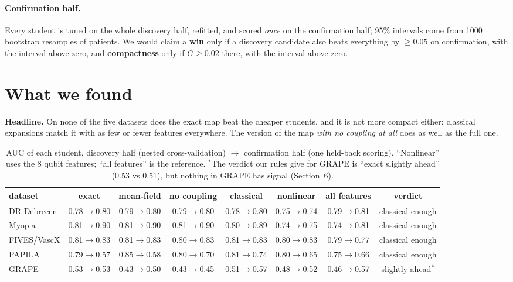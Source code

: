 \documentclass[11pt]{article}
\begin{document}
\paragraph{Confirmation half.} Every student is tuned on the whole discovery half, refitted, and scored
\emph{once} on the confirmation half; 95\% intervals come from 1000 bootstrap resamples of patients. We
would claim a \textbf{win} only if a discovery candidate also beats everything by $\ge0.05$ on confirmation,
with the interval above zero, and \textbf{compactness} only if $G\ge0.02$ there, with the interval above zero.

\section{What we found}

\textbf{Headline.} On none of the five datasets does the exact map beat the cheaper students, and it is not
more compact either: classical expansions match it with as few or fewer features everywhere. The version of
the map \emph{with no coupling at all} does as well as the full one.

\begin{table}[H]\centering\small
\caption{AUC of each student, discovery half (nested cross-validation) $\to$ confirmation half (one held-back
scoring). ``Nonlinear'' uses the 8 qubit features; ``all features'' is the reference.
$^\ast$The verdict our rules give for GRAPE is ``exact slightly ahead'' (0.53 vs 0.51), but nothing in GRAPE
has signal (Section~6).}\label{tab:auc}
\footnotesize\setlength{\tabcolsep}{3.5pt}
\begin{tabular}{@{}lccccccc@{}}\toprule
dataset & exact & mean-field & no coupling & classical & nonlinear & all features & verdict\\\midrule
DR Debrecen & 0.78$\to$0.80 & 0.79$\to$0.80 & 0.79$\to$0.80 & 0.78$\to$0.80 & 0.75$\to$0.74 & 0.79$\to$0.81 & classical enough\\
Myopia      & 0.81$\to$0.90 & 0.81$\to$0.90 & 0.81$\to$0.90 & 0.80$\to$0.89 & 0.74$\to$0.75 & 0.74$\to$0.81 & classical enough\\
FIVES/VascX & 0.81$\to$0.83 & 0.81$\to$0.83 & 0.80$\to$0.83 & 0.81$\to$0.83 & 0.80$\to$0.83 & 0.79$\to$0.77 & classical enough\\
PAPILA      & 0.79$\to$0.57 & 0.85$\to$0.58 & 0.80$\to$0.70 & 0.81$\to$0.74 & 0.80$\to$0.65 & 0.75$\to$0.66 & classical enough\\
GRAPE       & 0.53$\to$0.53 & 0.43$\to$0.50 & 0.43$\to$0.45 & 0.51$\to$0.57 & 0.48$\to$0.52 & 0.46$\to$0.57 & slightly ahead$^\ast$\\\bottomrule
\end{tabular}
\end{table}
\end{document}
